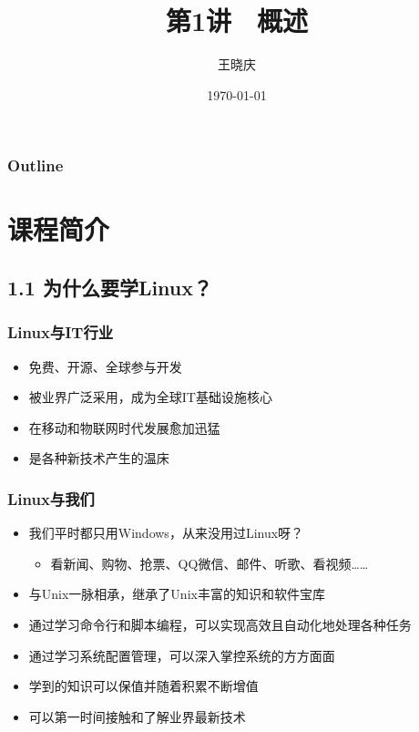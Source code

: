 \documentclass[xcolor=svgnames,presentation]{beamer}
\title{第1讲　概述}
\author{王晓庆}
\date{\today}
\institute{wangxiaoqing@outlook.com}
\begin{document}
\maketitle

\begin{frame}
\frametitle{Outline}
\setcounter{tocdepth}{1}
\tableofcontents
\end{frame}

\section{课程简介}
\label{sec-1}
\subsection{1.1 为什么要学Linux？}
\label{sec-1-1}
\begin{frame}
\frametitle{Linux与IT行业}
\label{sec-1-1-1}
\begin{itemize}

\item 免费、开源、全球参与开发
\label{sec-1-1-1-1}%

\item 被业界广泛采用，成为全球IT基础设施核心
\label{sec-1-1-1-2}%

\item 在移动和物联网时代发展愈加迅猛
\label{sec-1-1-1-3}%

\item 是各种新技术产生的温床
\label{sec-1-1-1-4}%
\end{itemize} %
\end{frame}
\begin{frame}
\frametitle{Linux与我们}
\label{sec-1-1-2}
\begin{itemize}

\item 我们平时都只用Windows，从来没用过Linux呀？
\label{sec-1-1-2-1}%
\begin{itemize}

\item 看新闻、购物、抢票、QQ微信、邮件、听歌、看视频……
\label{sec-1-1-2-1-1}%
\end{itemize} %

\item 与Unix一脉相承，继承了Unix丰富的知识和软件宝库
\label{sec-1-1-2-2}%

\item 通过学习命令行和脚本编程，可以实现高效且自动化地处理各种任务
\label{sec-1-1-2-3}%

\item 通过学习系统配置管理，可以深入掌控系统的方方面面
\label{sec-1-1-2-4}%

\item 学到的知识可以保值并随着积累不断增值
\label{sec-1-1-2-5}%

\item 可以第一时间接触和了解业界最新技术
\label{sec-1-1-2-6}%
\end{itemize} %
\end{frame}
\end{document}
